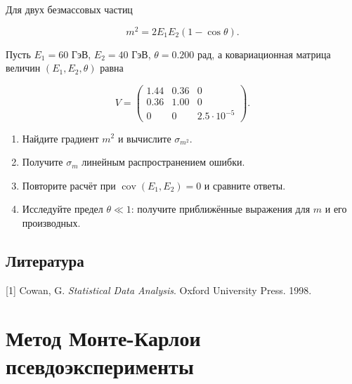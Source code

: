 \documentclass[
  russian,
  11pt,
  a4paper,
  open=any]{scrbook}
\newlength{\cslhangindent}
\newenvironment{CSLReferences}[2] %
 {\begin{list}{}{%
  \setlength{\itemindent}{0pt}
  \setlength{\leftmargin}{0pt}
  \setlength{\parsep}{0pt}
  \ifodd #1
   \setlength{\leftmargin}{\cslhangindent}
   \setlength{\itemindent}{-1\cslhangindent}
  \fi
  \setlength{\itemsep}{#2\baselineskip}}}
 {\end{list}}
\providecommand{\tightlist}{%
  \setlength{\itemsep}{0pt}\setlength{\parskip}{0pt}}
\DeclareRobustCommand{\BookTitleBreak}{\space}
\begin{document}
\begin{semanticpdfbox}[colback=BookCoralSoft,borderline west={1.2mm}{0pt}{BookCoral}]

\par\nopagebreak[4]\vspace{1.2mm}

Для двух безмассовых частиц

\[
m^2=2E_1E_2(1-\cos\theta).
\]

Пусть \(E_1=60\) ГэВ, \(E_2=40\) ГэВ, \(\theta=0.200\) рад, а
ковариационная матрица величин \((E_1,E_2,\theta)\) равна

\[
V=
\begin{pmatrix}
1.44&0.36&0\\
0.36&1.00&0\\
0&0&2.5\cdot10^{-5}
\end{pmatrix}.
\]

\begin{enumerate}
\def\labelenumi{\arabic{enumi}.}
\tightlist
\item
  Найдите градиент \(m^2\) и вычислите \(\sigma_{m^2}\).
\item
  Получите \(\sigma_m\) линейным распространением ошибки.
\item
  Повторите расчёт при \(\operatorname{cov}(E_1,E_2)=0\) и сравните
  ответы.
\item
  Исследуйте предел \(\theta\ll1\): получите приближённые выражения для
  \(m\) и его производных.
\end{enumerate}

\end{semanticpdfbox}

\section*{Литература}\label{ux43bux438ux442ux435ux440ux430ux442ux443ux440ux430-6}


\protect{}\label{refs}
\begin{CSLReferences}{0}{0}
{[}1{]} Cowan, G. \emph{Statistical Data Analysis}. Oxford University
Press. 1998.

\end{CSLReferences}

\chapter{\texorpdfstring{\texorpdfstring{Метод Монте-Карло\BookTitleBreak{}и псевдоэксперименты}{Метод Монте-Карло и псевдоэксперименты}}{Метод Монте-Карло и псевдоэксперименты}}\label{ux43cux435ux442ux43eux434-ux43cux43eux43dux442ux435-ux43aux430ux440ux43bux43e-ux438-ux43fux441ux435ux432ux434ux43eux44dux43aux441ux43fux435ux440ux438ux43cux435ux43dux442ux44b}
\end{document}
